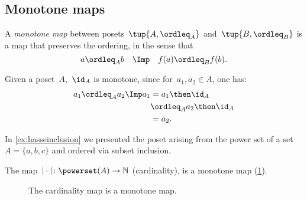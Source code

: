 \subsection{Monotone maps}

\begin{definition}
A \emph{monotone map} between posets~$\tup{A, \ordleq_A}$ and~$\tup{B, \ordleq_B}$ is a map that preserves the ordering, in the sense that 
\begin{equation}
 a \ordleq_A b \quad \Imp \quad f(a) \ordleq_B f(b).
\end{equation}

\begin{comment}\noindent A monotone map is an \emph{isomorphism} if the other direction
of the implication holds as well:
\begin{equation}
 a \leq_A b \quad \Leftrightarrow \quad f(a) \leq_B f(b).
\end{equation}
\end{comment}
\end{definition}
\begin{remark}
Given a poset~$A$,~$\id_A$ is monotone, since for~$a_1,a_2\in A$, one has:
\begin{equation}
\begin{aligned}
a_1\ordleq_A a_2 \Imp a_1&=a_1\then \id_A\\
&\ordleq_A a_2\then \id_A \\
&= a_2.
\end{aligned}
\end{equation}
\end{remark}

\begin{example}
In \cref{ex:hasseinclusion} we presented the poset arising from the power set of a set~$A=\{a,b,c\}$ and ordered via subset inclusion.

The map~$\vert \cdot \vert \colon \powerset(A)\to \mathbb{N}$ (cardinality), is a monotone map (\cref{fig:cardinality}).
\begin{figure}[h!]
\begin{center}
\end{center}
\caption{The cardinality map is a monotone map. \label{fig:cardinality}}
\end{figure}
\end{example}

